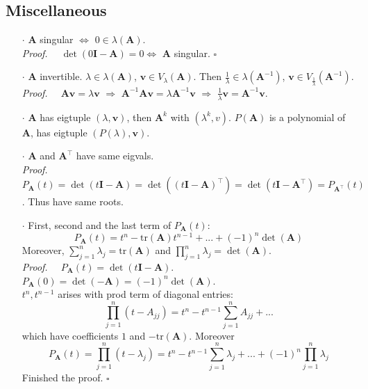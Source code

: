 \documentclass[a4paper, 11pt]{article}
\begin{document}
\subsection{Miscellaneous}
\begin{itemize}
  \item[$\cdot$] $\pmb{A}$ singular $\iff$ $0\in \lambda(\pmb{A})$.\\
  \textit{Proof.~~} $\det(0 \pmb{I}-\pmb{A})=0 \iff$ $\pmb{A}$ singular. $\square$

  \item[$\cdot$] $\pmb{A}$ invertible. $\lambda \in \lambda(\pmb{A})$, $\pmb{v}\in V_{\lambda}(\pmb{A})$. Then $\frac{1}{\lambda}\in \lambda(\pmb{A}^{-1})$, $\pmb{v}\in V_{\frac{1}{\lambda}}(\pmb{A}^{-1})$.\\
  \textit{Proof.~~} $\pmb{Av}=\lambda \pmb{v}$ $\Rightarrow$ $\pmb{A}^{-1}\pmb{Av} = \lambda \pmb{A}^{-1} \pmb{v}$ $\Rightarrow$ $\frac{1}{\lambda} \pmb{v} = \pmb{A}^{-1} \pmb{v}$. 

  \item[$\cdot$] $\pmb{A}$ has eigtuple $(\lambda, \pmb{v})$, then $\pmb{A}^k$ with $(\lambda^k, v)$. $P(\pmb{A})$ is a polynomial of $\pmb{A}$, has eigtuple $(P(\lambda), \pmb{v})$.

  \item[$\cdot$] $\pmb{A}$ and $\pmb{A}^{\top}$ have same eigvals.\\
  \textit{Proof.~~} $P_{\pmb{A}}(t) = \det(t\pmb{I}-\pmb{A}) = \det((t \pmb{I}-\pmb{A})^{\top}) = \det(t\pmb{I} - \pmb{A}^{\top}) = P_{\pmb{A}^{\top}}(t)$. Thus have same roots.

  \item[$\cdot$] First, second and the last term of $P_{\pmb{A}}(t)$:
  $$
  P_{\pmb{A}}(t) = t^n - \text{tr}(\pmb{A}) t^{n-1} + ... + (-1)^n\det(\pmb{A})
  $$
  Moreover, $\sum_{j=1}^n \lambda_j = \text{tr}(\pmb{A})$ and $\prod_{j=1}^n \lambda_j = \det(\pmb{A})$.\\
  \textit{Proof.~~} $P_{\pmb{A}}(t) = \det(t \pmb{I} - \pmb{A})$. \\
  $P_{\pmb{A}}(0)=\det(-\pmb{A})=(-1)^n\det(\pmb{A})$.\\
  $t^n, t^{n-1}$ arises with prod term of diagonal entries:
  $$
  \prod_{j=1}^n(t-A_{jj}) = t^n - t^{n-1}\sum_{j=1}^n A_{jj} + ...
  $$
  which have coefficients $1$ and $-\text{tr}(\pmb{A})$. Moreover
  $$
  P_{\pmb{A}}(t) = \prod_{j=1}^n(t- \lambda_j) = t^n - t^{n-1}\sum_{j=1}^n \lambda_j + ... + (-1)^n \prod_{j=1}^n \lambda_j
  $$
  Finished the proof. $\square$
\end{itemize}
\end{document}

